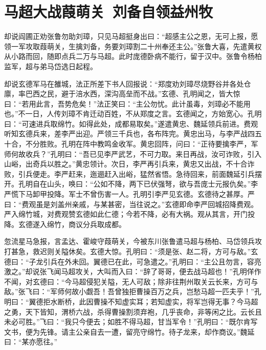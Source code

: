 \chapter{马超大战葭萌关~刘备自领益州牧}

却说阎圃正劝张鲁勿助刘璋，只见马超挺身出曰：“超感主公之恩，无可上报，愿领一军攻取葭萌关，生擒刘备，务要刘璋割二十州奉还主公。”张鲁大喜，先遣黄权从小路而回，随即点兵二万与马超。此时庞德卧病不能行，留于汉中。张鲁令杨柏监军，超与弟马岱选日起程。

却说玄德军马在雒城，法正所差下书人回报说：“郑度劝刘璋尽烧野谷并各处仓廪，率巴西之民，避于涪水西，深沟高垒而不战。”玄德、孔明闻之，皆大惊曰：“若用此言，吾势危矣！”法正笑曰：“主公勿忧。此计虽毒，刘璋必不能用也。”不一日，人传刘璋不肯迁动百姓，不从郑度之言。玄德闻之，方始宽心。孔明曰：“可速进兵取绵竹。如得此处，成都易取矣。”遂遣黄忠、魏延领兵前进。费观听知玄德兵来，差李严出迎。严领三千兵也，各布阵完。黄忠出马，与李严战四五十合，不分胜败。孔明在阵中教鸣金收军。黄忠回阵，问曰：“正待要擒李严，军师何故收兵？”孔明曰：“吾已见李严武艺，不可力取。来日再战，汝可诈败，引入山峪，出奇兵以胜之。”黄忠领计。次日，李严再引兵来，黄忠又出战，不十合诈败，引兵便走。李严赶来，迤逦赶入出峪，猛然省悟。急待回来，前面魏延引兵摆开。孔明自在山头，唤曰：“公如不降，两下已伏强弩，欲与吾庞士元报仇矣。”李严慌下马卸甲投降。军士不曾伤害一人。孔明引李严见玄德。玄德待之甚厚。严曰：“费观虽是刘盖州亲戚，与某甚密，当往说之。”玄德即命李严回城招降费观。严入绵竹城，对费观赞玄德如此仁德；今若不降，必有大祸。观从其言，开门投降。玄德遂入绵竹，商议分兵取成都。

忽流星马急报，言孟达、霍峻守葭萌关，今被东川张鲁遣马超与杨柏、马岱领兵攻打甚急，救迟则关隘休矣。玄德大惊。孔明曰：“须是张、赵二将，方可与敌。”玄德曰：“子龙引兵在外未回。翼德已在此，可急遣之。”孔明曰：“主公且勿言，容亮激之。”却说张飞闻马超攻关，大叫而入曰：“辞了哥哥，便去战马超也！”孔明佯作不闻，对玄德曰：“今马超侵犯关隘，无人可敌；除非往荆州取关云长来，方可与敌。”张飞曰：“军师何故小觑吾！吾曾独拒曹操百万之兵，岂愁马超一匹夫乎！”孔明曰：“翼德拒水断桥，此因曹操不知虚实耳；若知虚实，将军岂得无事？今马超之勇，天下皆知，渭桥六战，杀得曹操割须弃袍，几乎丧命，非等闲之比。云长且未必可胜。”飞曰：“我只今便去；如胜不得马超，甘当军令！”孔明曰：“既尔肯写文书，便为先锋。请主公亲自去一遭，留亮守绵竹。待子龙来，却作商议。”魏延曰：“某亦愿往。”

